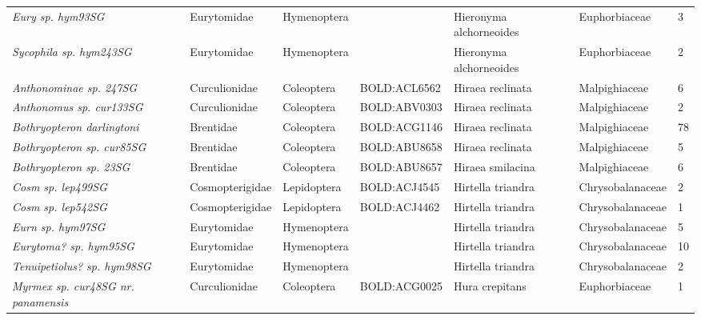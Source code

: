 \documentclass[11pt]{article}
\begin{document}
\begin{landscape}
\begin{longtable}{@{}lllllll@{}}
\textit{Eury sp. hym93SG}                             & Eurytomidae     & Hymenoptera  &              & Hieronyma alchorneoides            & Euphorbiaceae    & 3     \\
\textit{Sycophila sp. hym243SG}                       & Eurytomidae     & Hymenoptera  &              & Hieronyma alchorneoides            & Euphorbiaceae    & 2     \\
\textit{Anthonominae sp. 247SG}                       & Curculionidae   & Coleoptera   & BOLD:ACL6562 & Hiraea reclinata                   & Malpighiaceae    & 6     \\
\textit{Anthonomus sp. cur133SG}                      & Curculionidae   & Coleoptera   & BOLD:ABV0303 & Hiraea reclinata                   & Malpighiaceae    & 2     \\
\textit{Bothryopteron darlingtoni}                    & Brentidae       & Coleoptera   & BOLD:ACG1146 & Hiraea reclinata                   & Malpighiaceae    & 78    \\
\textit{Bothryopteron sp. cur85SG}                    & Brentidae       & Coleoptera   & BOLD:ABU8658 & Hiraea reclinata                   & Malpighiaceae    & 5     \\
\textit{Bothryopteron sp. 23SG}                       & Brentidae       & Coleoptera   & BOLD:ABU8657 & Hiraea smilacina                   & Malpighiaceae    & 6     \\
\textit{Cosm sp. lep499SG}                            & Cosmopterigidae & Lepidoptera  & BOLD:ACJ4545 & Hirtella triandra                  & Chrysobalanaceae & 2     \\
\textit{Cosm sp. lep542SG}                            & Cosmopterigidae & Lepidoptera  & BOLD:ACJ4462 & Hirtella triandra                  & Chrysobalanaceae & 1     \\
\textit{Eurn sp. hym97SG}                             & Eurytomidae     & Hymenoptera  &              & Hirtella triandra                  & Chrysobalanaceae & 5     \\
\textit{Eurytoma? sp. hym95SG}                        & Eurytomidae     & Hymenoptera  &              & Hirtella triandra                  & Chrysobalanaceae & 10    \\
\textit{Tenuipetiolus? sp. hym98SG}                   & Eurytomidae     & Hymenoptera  &              & Hirtella triandra                  & Chrysobalanaceae & 2     \\
\textit{Myrmex sp. cur48SG nr. panamensis}            & Curculionidae   & Coleoptera   & BOLD:ACG0025 & Hura crepitans                     & Euphorbiaceae    & 1     \\

\end{longtable}
\end{landscape}
\end{document}
